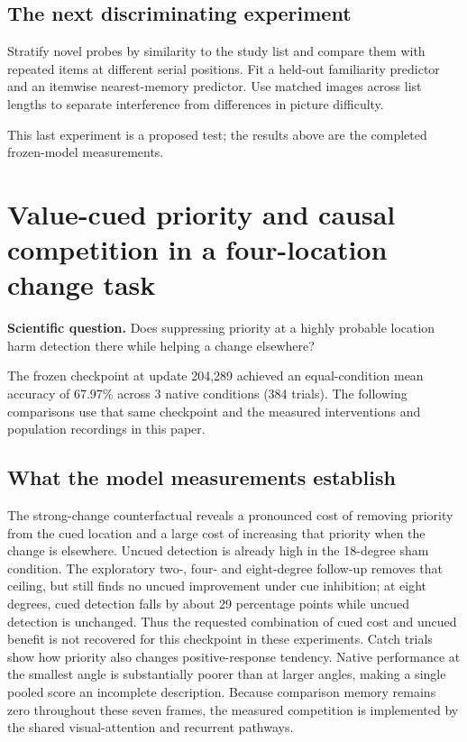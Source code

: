\documentclass[11pt]{article}
\begin{document}
\subsection{The next discriminating experiment}
Stratify novel probes by similarity to the study list and compare them with repeated items at different serial positions. Fit a held-out familiarity predictor and an itemwise nearest-memory predictor. Use matched images across list lengths to separate interference from differences in picture difficulty.

This last experiment is a proposed test; the results above are the completed frozen-model measurements.
\clearpage\section{Value-cued priority and causal competition in a four-location change task}
\textbf{Scientific question.} Does suppressing priority at a highly probable location harm detection there while helping a change elsewhere?

The frozen checkpoint at update 204,289 achieved an equal-condition mean accuracy of 67.97\% across 3 native conditions (384 trials). The following comparisons use that same checkpoint and the measured interventions and population recordings in this paper.

\subsection{What the model measurements establish}
The strong-change counterfactual reveals a pronounced cost of removing priority from the cued location and a large cost of increasing that priority when the change is elsewhere. Uncued detection is already high in the 18-degree sham condition. The exploratory two-, four- and eight-degree follow-up removes that ceiling, but still finds no uncued improvement under cue inhibition; at eight degrees, cued detection falls by about 29 percentage points while uncued detection is unchanged. Thus the requested combination of cued cost and uncued benefit is not recovered for this checkpoint in these experiments. Catch trials show how priority also changes positive-response tendency. Native performance at the smallest angle is substantially poorer than at larger angles, making a single pooled score an incomplete description. Because comparison memory remains zero throughout these seven frames, the measured competition is implemented by the shared visual-attention and recurrent pathways.
\end{document}
